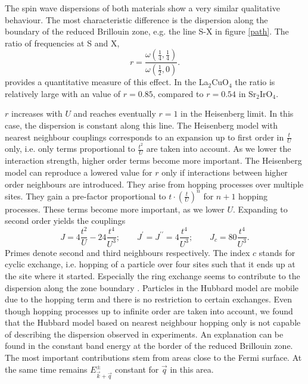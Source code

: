 \documentclass[a4paper,12pt]{report}
\begin{document}
The spin wave dispersions of both materials show a very similar qualitative behaviour.
The most characteristic difference is the dispersion along the boundary of the reduced Brillouin zone, e.g. the line S-X in figure \ref{path}.
The ratio of frequencies at S and X,
\begin{equation} 
r = \frac{ \omega(\frac14,\frac14) }{ \omega(\frac12,0) }. 
\end{equation}
provides a quantitative measure of this effect. 
In the La$_2$CuO$_4$ the ratio is relatively large with an value of $r = 0.85$, compared to $r=0.54$ in
Sr$_2$IrO$_4$.

$r$ increases with $U$ and reaches eventually $r=1$ 
in the Heisenberg limit.
In this case, the dispersion is constant along this line.
The Heisenberg model with nearest neighbour couplings corresponds to an expansion up to first order in $\frac tU$ only, 
i.e. only terms proportional to $\frac {t^2}{U}$ are taken into account.
As we lower the interaction strength, higher order terms become more important.
The Heisenberg model can reproduce a lowered value for $r$ only if interactions between higher order neighbours are introduced.
They arise from  hopping processes over multiple sites.
They gain a pre-factor proportional to $t\cdot(\frac tU)^n$  for $n+1$ hopping processes.
These terms become more important, as we lower $U$. 
Expanding to second order yields  the couplings \cite{0022-3719-10-8-031} 
\begin{equation}
 J = 4\frac{t^2}{U} -24\frac{t^4}{U^3}; \qquad J^{\prime} = J^{\prime \prime} = 4\frac{t^4}{U^3}; \qquad J_c = 80 \frac{t^4}{U^3}.
\end{equation}
Primes denote second and third neighbours respectively.
The index $c$ stands for cyclic exchange, 
i.e. hopping of a particle over four sites such that it ends up at the site where it started. 
Especially the ring exchange seems to contribute to the dispersion along the zone boundary \cite{PhysRevLett.86.5377}.
Particles in the Hubbard model are mobile due to the hopping term and there is no restriction to certain exchanges.
%
%
%
Even though  hopping processes up to infinite order are taken into account,
we found that the Hubbard model based on nearest neighbour hopping only is not capable of describing the dispersion observed in experiments.
An explanation can be found in the constant band energy at the border of the reduced Brillouin zone.
The most important contributions stem from areas close to the Fermi surface. 
At the same time remains $E^{\pm}_{\vec k + \vec q}$ constant for $\vec q$ in this area.
\end{document}
